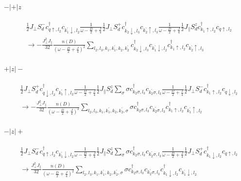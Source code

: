 \documentclass[12pt]{revtex4-2}
\begin{document}
\paragraph{\(-|+|z\)}
\begin{equation}\begin{aligned}
	&\frac{1}{2}J_\perp S_d^- c^\dagger_{q \uparrow, l_2}c_{k_1^\prime \downarrow, l_2}\frac{1}{\omega - \frac{D}{2} + \frac{J}{4}}\frac{1}{2}J_\perp S_d^+ c^\dagger_{k_2 \downarrow, l_3}c_{k_2^\prime \uparrow, l_3} \frac{1}{\omega - \frac{D}{2} + \frac{J}{4}} \frac{1}{2}J_\parallel S_d^z c^\dagger_{k_1 \uparrow, l_2} c_{q \uparrow, l_2} \\
	&\longrightarrow -\frac{J_\perp^2 J_\parallel}{32} \frac{n(D)}{\left(\omega - \frac{D}{2} + \frac{J}{4}\right)^2}\sum_{l_2, l_3, k_1,k_1^\prime,k_2,k_2^\prime}c^\dagger_{k_2 \downarrow, l_3}c_{k_1^\prime \downarrow, l_2}c^\dagger_{k_1 \uparrow, l_2}c_{k_2^\prime \uparrow, l_3}
\end{aligned}\end{equation}

\paragraph{\(+|z|-\)}
\begin{equation}\begin{aligned}
	&\frac{1}{2}J_\perp S_d^+ c^\dagger_{q \downarrow, l_2}c_{k_1^\prime \uparrow, l_2}\frac{1}{\omega - \frac{D}{2} + \frac{J}{4}}\frac{1}{2}J_\parallel S_d^z \sum_\sigma \sigma c^\dagger_{k_2 \sigma, l_3}c_{k_2^\prime \sigma, l_3} \frac{1}{\omega - \frac{D}{2} + \frac{J}{4}} \frac{1}{2}J_\perp S_d^- c^\dagger_{k_1 \uparrow, l_2} c_{q \downarrow, l_2} \\
	&\longrightarrow -\frac{J_\perp^2 J_\parallel}{32} \frac{n(D)}{\left(\omega - \frac{D}{2} + \frac{J}{4}\right)^2}\sum_{l_2, l_3, k_1,k_1^\prime,k_2,k_2^\prime,\sigma}\sigma c^\dagger_{k_2 \sigma, l_3}c_{k_2^\prime \sigma, l_3}c^\dagger_{k_1 \uparrow, l_2}c_{k_1^\prime \uparrow, l_2}
\end{aligned}\end{equation}

\paragraph{\(-|z|+\)}
\begin{equation}\begin{aligned}
	&\frac{1}{2}J_\perp S_d^- c^\dagger_{q \uparrow, l_2}c_{k_1^\prime \downarrow, l_2}\frac{1}{\omega - \frac{D}{2} + \frac{J}{4}}\frac{1}{2}J_\parallel S_d^z \sum_\sigma \sigma c^\dagger_{k_2 \sigma, l_3}c_{k_2^\prime \sigma, l_3} \frac{1}{\omega - \frac{D}{2} + \frac{J}{4}} \frac{1}{2}J_\perp S_d^+ c^\dagger_{k_1 \downarrow, l_2} c_{q \uparrow, l_2} \\
	&\longrightarrow \frac{J_\perp^2 J_\parallel}{32} \frac{n(D)}{\left(\omega - \frac{D}{2} + \frac{J}{4}\right)^2}\sum_{l_2, l_3, k_1,k_1^\prime,k_2,k_2^\prime,\sigma}\sigma c^\dagger_{k_2 \sigma, l_3}c_{k_2^\prime \sigma, l_3}c^\dagger_{k_1 \downarrow, l_2}c_{k_1^\prime \downarrow, l_2}
\end{aligned}\end{equation}
\end{document}
